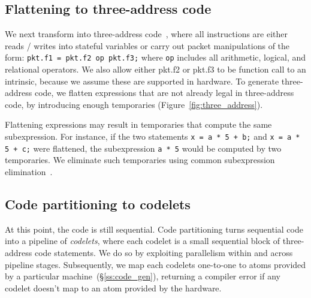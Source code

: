 \subsection{Flattening to three-address code}
We next transform into three-address code~\cite{tac}, where all instructions
are either reads / writes into stateful variables or carry out packet
manipulations of the form: \texttt{pkt.f1 = pkt.f2 op pkt.f3;} where
\texttt{op} includes all arithmetic, logical, and relational operators. We also
allow either pkt.f2 or pkt.f3 to be function call to an intrinsic, because we
assume these are supported in hardware. To generate three-address code, we
flatten expressions that are not already legal in three-address code, by
introducing enough temporaries (Figure~\ref{fig:three_address}).

Flattening expressions may result in temporaries that compute the same
subexpression. For instance, if the two statements \texttt{x = a * 5 + b;} and
\texttt{x = a * 5 + c;} were flattened, the subexpression \texttt{a * 5} would
be computed by two temporaries. We eliminate such temporaries using
common subexpression elimination~\cite{cse}.

\subsection{Code partitioning to codelets}
\label{ss:partitioning}
At this point, the code is still sequential. Code partitioning turns sequential
code into a pipeline of \textit{codelets}, where each codelet is a small
sequential block of three-address code statements. We do so by exploiting
parallelism within and across pipeline stages.  Subsequently, we map each
codelets one-to-one to atoms provided by a particular \absmachine
machine~(\S\ref{ss:code_gen}), returning a compiler error if any codelet
doesn't map to an atom provided by the hardware.

